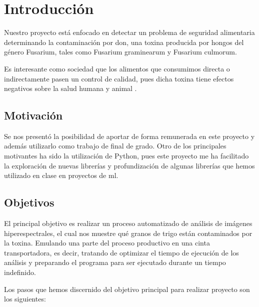 \section{Introducción}

Nuestro proyecto está enfocado en detectar un problema de seguridad alimentaria determinando la contaminación por \acrfull{don}, una toxina producida por hongos del género Fusarium, tales como Fusarium graminearum y Fusarium culmorum. 

Es interesante como sociedad que los alimentos que consumimos directa o indirectamente pasen un control de calidad, pues dicha toxina tiene efectos negativos sobre la salud humana y animal \cite{https://doi.org/10.2903/j.efsa.2017.4718}.


\subsection{Motivación}

Se nos presentó la posibilidad de aportar de forma remunerada en este proyecto y además utilizarlo como trabajo de final de grado. Otro de los principales motivantes ha sido la utilización de Python, pues este proyecto me ha facilitado la exploración de nuevas librerías y profundización de algunas librerías que hemos utilizado en clase en proyectos de \gls{ml}.


\subsection{Objetivos}

El principal objetivo es realizar un proceso automatizado de análisis de imágenes hiperespectrales, el cual nos muestre qué granos de trigo están contaminados por la toxina. Emulando una parte del proceso productivo en una cinta transportadora, es decir, tratando de optimizar el tiempo de ejecución de los análisis y preparando el programa para ser ejecutado durante un tiempo indefinido. 

Los pasos que hemos discernido del objetivo principal para realizar proyecto son los siguientes:

